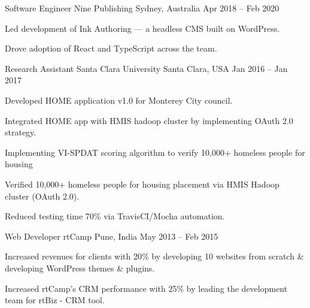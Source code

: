 \begin{cventries}
  \cventry
    {Software Engineer} %
    {Nine Publishing} %
    {Sydney, Australia} %
    {Apr 2018 -- Feb 2020} %
    {
      \begin{cvitems}
        \item {Led development of Ink Authoring --- a headless CMS built on WordPress.}
        \item {Drove adoption of React and TypeScript across the team.}
      \end{cvitems}
    }


  \cventry
    {Research Assistant} %
    {Santa Clara University} %
    {Santa Clara, USA} %
    {Jan 2016 -- Jan 2017} %
    {
      \begin{cvitems}
        \item {Developed HOME application v1.0 for Monterey City council.}
        \item {Integrated HOME app with HMIS hadoop cluster by implementing OAuth 2.0 strategy.}
        \item {Implementing VI-SPDAT scoring algorithm to verify 10,000+ homeless people for housing}
        \item {Verified 10,000+ homeless people for housing placement via HMIS Hadoop cluster (OAuth 2.0).}
        \item {Reduced testing time 70\% via TravisCI/Mocha automation.}
      \end{cvitems}
    }

  \cventry
    {Web Developer} %
    {rtCamp} %
    {Pune, India} %
    {May 2013 -- Feb 2015} %
    {
      \begin{cvitems}
        \item {Increased revenues for clients with 20\% by developing 10 websites from scratch \& developing WordPress themes \& plugins.}
        \item {Increased rtCamp's CRM performance with 25\% by leading the development team for rtBiz - CRM tool.}
      \end{cvitems}
    }

\end{cventries}
